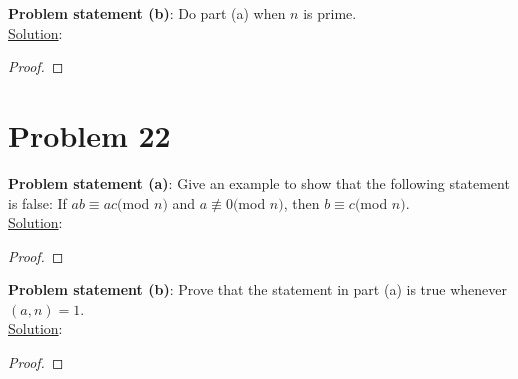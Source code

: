 \documentclass{article} %
\begin{document}
\hfill \break

\textbf{Problem statement (b)}: Do part (a) when $n$ is prime. 
\\

\underline{Solution}: 
\begin{addmargin}[1em]{0em}
\begin{proof}

\end{proof}
\end{addmargin}

\newpage

\section*{Problem 22}


\textbf{Problem statement (a)}: Give an example to show that the following statement is false: If $ab \equiv ac($mod $n)$ and $a \not\equiv 0 ($mod $n)$, then $b \equiv c($mod $ n)$. 
\\

\underline{Solution}: 
\begin{addmargin}[1em]{0em}
\begin{proof}

\end{proof}
\end{addmargin}

\hfill \break

\textbf{Problem statement (b)}: Prove that the statement in part (a) is true whenever $(a,n) = 1$.
\\

\underline{Solution}: 
\begin{addmargin}[1em]{0em}
\begin{proof}

\end{proof}
\end{addmargin}

\end{document}
